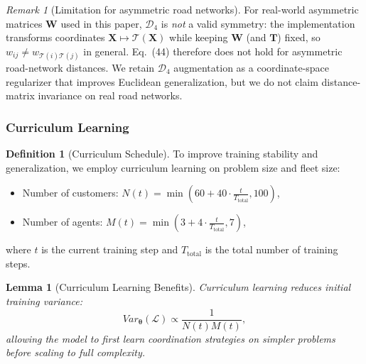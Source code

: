 \documentclass[journal,twoside,web]{ieeecolor}
\newtheorem{lemma}[theorem]{Lemma}
\theoremstyle{definition}
\newtheorem{definition}[theorem]{Definition}
\theoremstyle{remark}
\newtheorem{remark}[theorem]{Remark}
\theoremstyle{definition}
\begin{document}
\begin{remark}[Limitation for asymmetric road networks]
For real-world asymmetric matrices $\mathbf{W}$ used in this paper, $\mathcal{D}_4$ is \emph{not} a valid symmetry: the implementation transforms coordinates $\mathbf{X}\mapsto\mathcal{T}(\mathbf{X})$ while keeping $\mathbf{W}$ (and $\mathbf{T}$) fixed, so $w_{ij}\neq w_{\mathcal{T}(i)\mathcal{T}(j)}$ in general. Eq.~(44) therefore does not hold for asymmetric road-network distances. We retain $\mathcal{D}_4$ augmentation as a coordinate-space regularizer that improves Euclidean generalization, but we do not claim distance-matrix invariance on real road networks.
\end{remark}

\subsubsection{Curriculum Learning}
\begin{definition}[Curriculum Schedule]
To improve training stability and generalization, we employ curriculum learning\cite{bengio2009curriculum,hacohen2019power} on problem size and fleet size:
\begin{itemize}
    \item Number of customers: $N(t) = \min(60 + 40 \cdot \frac{t}{T_{\text{total}}}, 100)$,
    \item Number of agents: $M(t) = \min(3 + 4 \cdot \frac{t}{T_{\text{total}}}, 7)$,
\end{itemize}
where $t$ is the current training step and $T_{\text{total}}$ is the total number of training steps.
\end{definition}

\begin{lemma}[Curriculum Learning Benefits]
Curriculum learning reduces initial training variance:
\begin{equation}
Var_{\boldsymbol{\theta}}(\mathcal{L}) \propto \frac{1}{N(t) M(t)},
\end{equation}
allowing the model to first learn coordination strategies on simpler problems before scaling to full complexity.
\end{lemma}
\end{document}
